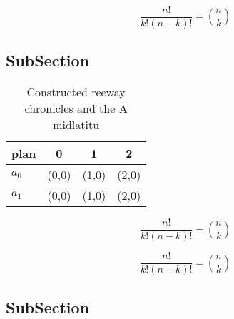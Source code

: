 \documentclass[a4paper]{article}
\begin{document}
\[ \frac{n!}{k!(n-k)!} = \binom{n}{k} \]

\subsection{SubSection}

\begin{table}
\begin{adjustbox}{width=0.6\columnwidth}
\begin{tabular}{|l|l|l|l|}
\hline
\textbf{plan} & \multicolumn{1}{c|}{\textbf{0}} & \multicolumn{1}{c|}{\textbf{1}} & \multicolumn{1}{c|}{\textbf{2}} \\ \hline
\textbf{$a_0$}  & (0,0) & (1,0) & (2,0) \\ \hline
\textbf{$a_1$}  & (0,0) & (1,0) & (2,0) \\ \hline
\end{tabular}
\end{adjustbox}
\caption{Constructed reeway chronicles and the A midlatitu
}
\end{table}

\[ \frac{n!}{k!(n-k)!} = \binom{n}{k} \]

\[ \frac{n!}{k!(n-k)!} = \binom{n}{k} \]

\subsection{SubSection}
\end{document}
